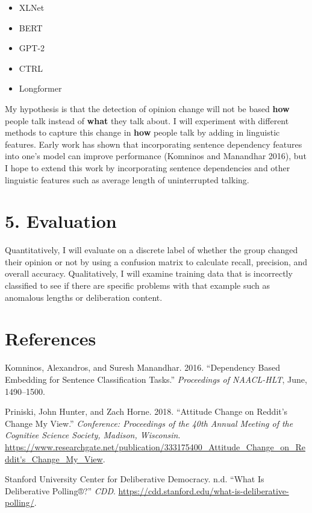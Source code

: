 \documentclass[12pt,]{article}
\providecommand{\tightlist}{%
\setlength{\itemsep}{0pt}\setlength{\parskip}{0pt}}
\begin{document}
\begin{itemize}
\tightlist
\item
  XLNet
\item
  BERT
\item
  GPT-2
\item
  CTRL
\item
  Longformer
\end{itemize}

My hypothesis is that the detection of opinion change will not be based
\textbf{how} people talk instead of \textbf{what} they talk about. I
will experiment with different methods to capture this change in
\textbf{how} people talk by adding in linguistic features. Early work
has shown that incorporating sentence dependency features into one's
model can improve performance (Komninos and Manandhar 2016), but I hope
to extend this work by incorporating sentence dependencies and other
linguistic features such as average length of uninterrupted talking.

\hypertarget{evaluation}{%
\section{5. Evaluation}\label{evaluation}}

Quantitatively, I will evaluate on a discrete label of whether the group
changed their opinion or not by using a confusion matrix to calculate
recall, precision, and overall accuracy. Qualitatively, I will examine
training data that is incorrectly classified to see if there are
specific problems with that example such as anomalous lengths or
deliberation content.

\hypertarget{references}{%
\section*{References}\label{references}}

\hypertarget{refs}{}
\leavevmode\hypertarget{ref-komninos}{}%
Komninos, Alexandros, and Suresh Manandhar. 2016. ``Dependency Based
Embedding for Sentence Classification Tasks.'' \emph{Proceedings of
NAACL-HLT}, June, 1490--1500.

\leavevmode\hypertarget{ref-cmv}{}%
Priniski, John Hunter, and Zach Horne. 2018. ``Attitude Change on
Reddit's Change My View.'' \emph{Conference: Proceedings of the 40th
Annual Meeting of the Cognitiee Science Society, Madison, Wisconsin}.
\url{https://www.researchgate.net/publication/333175400_Attitude_Change_on_Reddit's_Change_My_View}.

\leavevmode\hypertarget{ref-cdd}{}%
Stanford University Center for Deliberative Democracy. n.d. ``What Is
Deliberative Polling®?'' \emph{CDD}.
\url{https://cdd.stanford.edu/what-is-deliberative-polling/}.





\newpage
\singlespacing 
\end{document}
